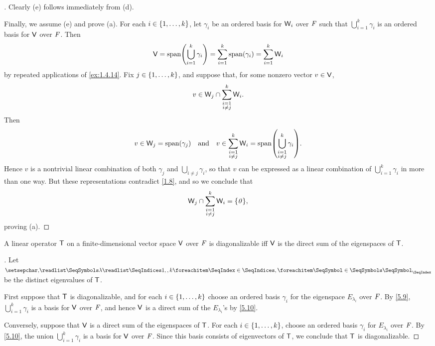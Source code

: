\begin{proof}[]
	Clearly (e) follows immediately from (d).

	Finally, we assume (e) and prove (a).
	For each \(i \in \left\lbrace1, \dots, k\right\rbrace\), let \(\gamma_i\) be an ordered basis for \(\mathsf{W}_i\) over \(\mathit{F}\) such that \(\bigcup_{i = 1}^k \gamma_i\) is an ordered basis for \(\mathsf{V}\) over \(\mathit{F}\).
	Then
	\[
		\V = \spn{\bigcup_{i = 1}^k \gamma_i} = \sum_{i = 1}^k \spn{\gamma_i} = \sum_{i = 1}^k \W_i
	\]
	by repeated applications of \cref{ex:1.4.14}.
	Fix \(j \in \left\lbrace1, \dots, k\right\rbrace\), and suppose that, for some nonzero vector \(v \in \mathsf{V}\),
	\[
		v \in \mathsf{W}_j \cap \sum_{\substack{i = 1 \\ i \neq j}}^k \mathsf{W}_i.
	\]
	Then
	\[
		v \in \W_j = \spn{\gamma_j} \quad \text{and} \quad v \in \sum_{\substack{i = 1 \\ i \neq j}}^k \W_i = \spn{\bigcup_{\substack{i = 1 \\ i \neq j}}^k \gamma_i}.
	\]
	Hence \(v\) is a nontrivial linear combination of both \(\gamma_j\) and \(\bigcup_{i \neq j} \gamma_i\), so that \(v\) can be expressed as a linear combination of \(\bigcup_{i = 1}^k \gamma_i\) in more than one way.
	But these representations contradict \cref{1.8}, and so we conclude that
	\[
		\W_j \cap \sum_{\substack{i = 1 \\ i \neq j}}^k \W_i = \set{\zv},
	\]
	proving (a).
\end{proof}

\begin{thm}\label{5.11}
	A linear operator \(\mathsf{T}\) on a finite-dimensional vector space \(\mathsf{V}\) over \(\mathit{F}\) is diagonalizable iff \(\mathsf{V}\) is the direct sum of the eigenspaces of \(\mathsf{T}\).
\end{thm}

\begin{proof}[]
	Let \(\seq{\lambda}{1,,k}\) be the distinct eigenvalues of \(\mathsf{T}\).

	First suppose that \(\mathsf{T}\) is diagonalizable, and for each \(i \in \left\lbrace1, \dots, k\right\rbrace\) choose an ordered basis \(\gamma_i\) for the eigenspace \(E_{\lambda_i}\) over \(\mathit{F}\).
	By \cref{5.9}, \(\bigcup_{i = 1}^k \gamma_i\) is a basis for \(\mathsf{V}\) over \(\mathit{F}\), and hence \(\mathsf{V}\) is a direct sum of the \(E_{\lambda_i}\)'s by \cref{5.10}.

	Conversely, suppose that \(\mathsf{V}\) is a direct sum of the eigenspaces of \(\mathsf{T}\).
	For each \(i \in \left\lbrace1, \dots, k\right\rbrace\), choose an ordered basis \(\gamma_i\) for \(E_{\lambda_i}\) over \(\mathit{F}\).
	By \cref{5.10}, the union \(\bigcup_{i = 1}^k \gamma_i\) is a basis for \(\mathsf{V}\) over \(\mathit{F}\).
	Since this basis consists of eigenvectors of \(\mathsf{T}\), we conclude that \(\mathsf{T}\) is diagonalizable.
\end{proof}


